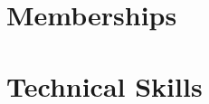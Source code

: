 \documentclass[margin,line]{res}
\begin{document}
\begin{resume}
\section{\sc Memberships}
    
\section{\sc Technical Skills}
    
%     
%     
\end{resume}
\end{document}
